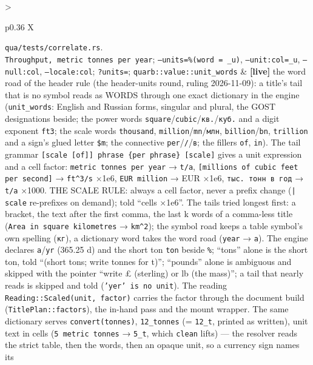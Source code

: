\documentclass{report}
\newcommand{\live}{\textbf{\textcolor{blue!60!black}{[live]}}\xspace}
\begin{document}
\begin{xltabular}{\textwidth}{>{\raggedright\arraybackslash}p{0.36\textwidth} X}
    \texttt{qua/tests/correlate.rs}. \\
\texttt{Throughput, metric tonnes per year}; \texttt{--units=\%(word = \_u)}, \texttt{--unit:col=\_u}, \texttt{--null:col}, \texttt{--locale:col}; \texttt{?units=}; \texttt{quarb::value::unit\_words}
  & \live the word road of the header rule (the header-units round,
    ruling 2026-11-09): a title's tail that is no symbol reads as
    WORDS through one exact dictionary in the engine
    (\texttt{unit\_words}: English and Russian forms, singular and
    plural, the GOST designations beside; the power words
    \texttt{square}/\texttt{cubic}/\texttt{кв.}/\texttt{куб.} and a
    digit exponent \texttt{ft3}; the scale words \texttt{thousand},
    \texttt{million}/\texttt{mn}/\texttt{млн}, \texttt{billion}/\texttt{bn},
    \texttt{trillion} and a sign's glued letter \texttt{\$m}; the
    connective \texttt{per}/\texttt{/}/\texttt{в}; the fillers
    \texttt{of}, \texttt{in}). The tail grammar \texttt{[scale [of]]
    phrase \{per phrase\} [scale]} gives a unit expression and a
    cell factor: \texttt{metric tonnes per year} → \texttt{t/a},
    \texttt{[millions of cubic feet per second]} → \texttt{ft\^{}3/s}
    ×1e6, \texttt{EUR million} → EUR ×1e6, \texttt{тыс. тонн в год} →
    \texttt{t/a} ×1000. THE SCALE RULE: always a cell factor, never a
    prefix change (\texttt{| scale} re-prefixes on demand); told
    ``cells ×1e6''. The tails tried longest first: a bracket, the
    text after the first comma, the last k words of a comma-less
    title (\texttt{Area in square kilometres} → \texttt{km\^{}2}); the
    symbol road keeps a table symbol's own spelling (\texttt{кг}),
    a dictionary word takes the word road (\texttt{year} → \texttt{a}).
    The engine declares \texttt{a}/\texttt{yr} (365.25 d) and the short
    ton \texttt{ton} beside \texttt{\%}; ``tons'' alone is the short
    ton, told ``(short tons; write tonnes for t)''; ``pounds'' alone is
    ambiguous and skipped with the pointer ``write £ (sterling) or lb
    (the mass)''; a tail that nearly reads is skipped and told
    (\texttt{'yer' is no unit}). The reading
    \texttt{Reading::Scaled(unit, factor)} carries the factor through
    the document build (\texttt{TitlePlan::factors}), the in-hand pass
    and the mount wrapper. The same dictionary serves
    \texttt{convert(tonnes)}, \texttt{12\_tonnes} (= \texttt{12\_t}, printed
    as written), unit text in cells (\texttt{5 metric tonnes} → \texttt{5\_t},
    which \texttt{clean} lifts) — the resolver reads the strict table,
    then the words, then an opaque unit, so a currency sign names its

\end{xltabular}
\end{document}

